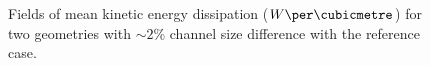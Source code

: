 \begin{figure}[!ht]
\centering
\caption{Fields of mean kinetic energy dissipation (${W\per\cubicmetre}$) for two geometries with $\sim2$\% channel size difference with the reference case.}
\label{fig:swirler_mod_phi}
\end{figure}

